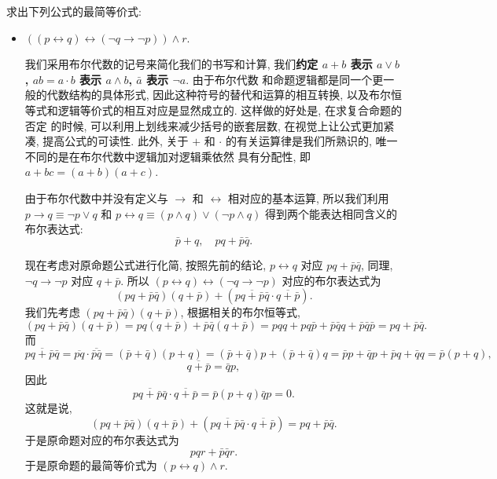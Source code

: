\documentclass[10pt,UTF8]{book} %
\begin{document}
\begin{exercise}
    求出下列公式的最简等价式:
    \begin{itemize}[itemsep=0pt]
        \item $((p \leftrightarrow q) \leftrightarrow (\lnot q \to \lnot p))\wedge r$.
        \begin{sol}
            我们采用布尔代数的记号来简化我们的书写和计算, 我们\textbf{约定 $a+b$ 表示 $a \vee b$,
            $ab = a \cdot b$ 表示 $a \wedge b$, $\bar a$ 表示 $\lnot a$}. 由于布尔代数
            和命题逻辑都是同一个更一般的代数结构的具体形式, 因此这种符号的替代和运算的相互转换,
            以及布尔恒等式和逻辑等价式的相互对应是显然成立的. 这样做的好处是, 在求复合命题的否定
            的时候, 可以利用上划线来减少括号的嵌套层数, 在视觉上让公式更加紧凑, 提高公式的可读性. 此外, 关于 $+$
            和 $\cdot$ 的有关运算律是我们所熟识的, 唯一不同的是在布尔代数中逻辑加对逻辑乘依然
            具有分配性, 即 $a + bc = (a+b)(a+c)$.

            由于布尔代数中并没有定义与 $\to$ 和 $\leftrightarrow$ 相对应的基本运算,
            所以我们利用 $p \to q \equiv \lnot p \vee q$ 和
            $p \leftrightarrow q \equiv (p \wedge q)\vee(\lnot p \wedge q)$
            得到两个能表达相同含义的布尔表达式:
            \[ \bar p + q, \quad pq+\bar p \bar q. \]

            现在考虑对原命题公式进行化简, 按照先前的结论, $p \leftrightarrow q$ 对应
            $pq+\bar p \bar q$, 同理, $\lnot q \to \lnot p$ 对应
            $q + \bar p$.
            所以 $(p \leftrightarrow q) \leftrightarrow (\lnot q \to \lnot p)$ 
            对应的布尔表达式为
            \[ (pq + \bar p \bar q)(q + \bar p) + \left(\overline{pq + \bar p \bar q}
            \cdot \overline{q + \bar p}\right). \]
            我们先考虑 $(pq + \bar p \bar q)(q + \bar p)$,
            根据相关的布尔恒等式,
            \[ (pq + \bar p \bar q)(q + \bar p) 
            = pq(q + \bar p) + \bar p \bar q (q + \bar p)
            = pqq + pq\bar p + \bar p \bar q q + \bar p \bar q \bar p 
            = pq + \bar p \bar q. \]
            而
            \[ \overline{pq + \bar p \bar q}
            = \overline{pq} \cdot \overline{\bar p \bar q}
            = (\bar p + \bar q) (p + q)
            =(\bar p + \bar q)p + (\bar p + \bar q) q 
            = \bar p p + \bar q p + \bar p q + \bar q q 
            = \bar p(p+q), \]
            \[ \overline{q + \bar p} = \bar q p, \]
            因此 \[ \overline{pq + \bar p \bar q}
            \cdot \overline{q + \bar p} = \bar p (p+q) \bar q p = 0. \]
            这就是说,
            \[ (pq + \bar p \bar q)(q + \bar p) + \left(\overline{pq + \bar p \bar q}
            \cdot \overline{q + \bar p}\right) = pq + \bar p \bar q. \]
            于是原命题对应的布尔表达式为
            \[ pqr + \bar p \bar q r. \]
            于是原命题的最简等价式为 $(p \leftrightarrow q) \wedge r$.
        \end{sol}


\end{itemize}
\end{exercise}
\end{document}
